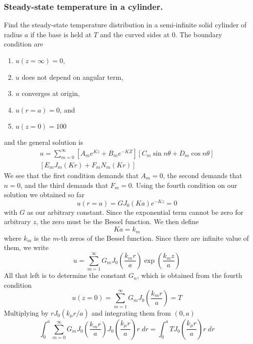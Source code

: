 \documentclass[../../main.tex]{subfiles}
\begin{document}
\subsubsection*{Steady-state temperature in a cylinder.} Find the steady-state temperature distribution in a semi-infinite solid cylinder of radius $a$ if the base is held at $T$ and the curved sides at 0\textdegree. The boundary condition are 
\begin{enumerate}
  \item $u(z=\infty)=0$,
  \item $u$ does not depend on angular term,
  \item $u$ converges at origin,
  \item $u(r=a)=0$, and
  \item $u(z=0)=100$
\end{enumerate}
and the general solution is 
\begin{multline*}
  u=\sum_{m=0}^{\infty}\left[A_me^{Kz}+B_me^{-KZ}\right]\left[C_m\sin n\theta +D_m\cos n\theta\right]\\
  \left[E_mJ_m(Kr)+F_mN_m(Kr)\right]
\end{multline*}
We see that the first condition demands that $A_m=0$, the second demands that $n=0$, and the third demands that $F_m=0$. Using the fourth condition on our solution we obtained so far
\begin{equation*}
  u(r=a)=GJ_0(Ka)e^{-Kz}=0
\end{equation*}
with $G$ as our arbitrary constant. Since the exponential term cannot be zero for arbitrary $z$, the zero must be the Bessel function. We then define 
\begin{equation*}
  Ka=k_m
\end{equation*}
where $k_m$ is the $m$-th zeros of the Bessel function. Since there are infinite value of them, we write 
\begin{equation*}
  u=\sum_{m=1}^{\infty}G_mJ_0\left(\frac{k_mr}{a}\right)\exp\left(\frac{k_mz}{a}\right)
\end{equation*}
All that left is to determine the constant $G_n$, which is obtained from the fourth condition
\begin{equation*}
  u(z=0)=\sum_{m=1}^{\infty}G_mJ_0\left(\frac{k_mr}{a}\right)=T
\end{equation*} 
Multiplying by $rJ_0(k_\mu r/a)$ and integrating them from $(0,a)$
\begin{equation*}
  \int_{0}^{a}\sum_{m=0}^{\infty}G_mJ_0\left(\frac{k_mr}{a}\right)J_0\left(\frac{k_\mu r}{a}\right)r\;dr=\int_{0}^{a}TJ_0\left(\frac{k_\mu r}{a}\right)r\;dr
\end{equation*}
\end{document}
